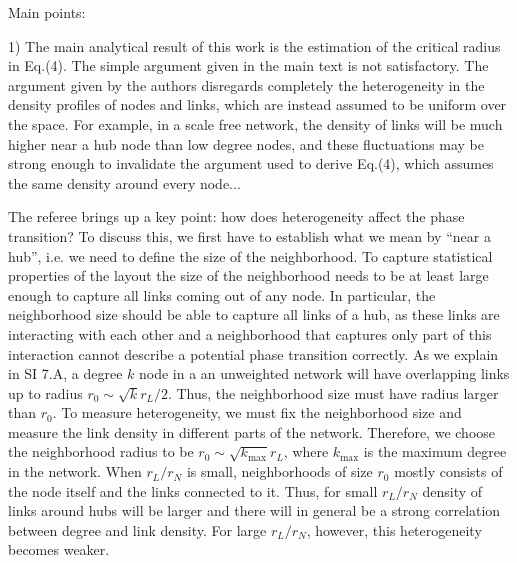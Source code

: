 \documentclass[11pt]{article}
\begin{document}
\noindent
Main points:
\begin{response}{
1) The main analytical result of this work is the estimation of the critical radius in Eq.(4). 
The simple argument given in the main text is not satisfactory. 
The argument given by the authors disregards completely the heterogeneity in the density profiles of nodes and links, which are instead assumed to be uniform over the space. 
For example, in a scale free network, the density of links will be much higher near a hub node than low degree nodes, and these fluctuations may be strong enough to invalidate the argument used to derive Eq.(4), which assumes the same density around every node...

}

The referee brings up a key point: how does heterogeneity affect the phase transition? 
To discuss this, we first have to establish what we mean by ``near a hub'', i.e. we need to define the size of the neighborhood.
To capture statistical properties of the layout the size of the neighborhood needs to be at least large enough to capture all links coming out of any node. 
In particular, the neighborhood size should be able to capture all links of a hub, as these links are interacting with each other and a neighborhood that captures only part of this interaction cannot describe a potential phase transition correctly. 
As we explain in SI 7.A, a degree $k$ node in a an unweighted network will have overlapping links up to radius $r_0\sim \sqrt{k} r_L/2 $. 
Thus, the neighborhood size must have radius larger than $r_0$. 
To measure heterogeneity, we must fix the neighborhood size and measure the link density in different parts of the network. 
Therefore, we choose the neighborhood radius to be $r_0\sim \sqrt{k_{\max}} r_L  $, where $k_{\max}$ is the maximum degree in the network. 
When $r_L/r_N$ is small, neighborhoods of size $r_0$ mostly consists of the node itself and the links connected to it. 
Thus, for small $r_L/r_N$ density of links around hubs will be larger and there will in general be a strong correlation between degree and link density. 
For large $r_L/r_N$, however, this heterogeneity becomes weaker. 


\end{response}
\end{document}
